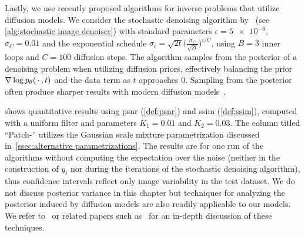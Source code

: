 Lastly, we use recently proposed algorithms for inverse problems that utilize diffusion models.
We consider the stochastic denoising algorithm by~\cite{kawar_stochastic_2021} (see \cref{alg:stochastic image denoiser}) with standard parameters \( \epsilon = \num{5e-6} \), \( \sigma_{C} = \num{0.01} \) and the exponential schedule \( \sigma_i = \sqrt{\num{2}t} \bigl(\frac{\sigma_{C}}{\sqrt{\num{2}t}}\bigr)^{i/C} \), using \( B = \num{3} \) inner loops and \( C = \num{100} \) diffusion steps.
The algorithm samples from the posterior of a denoising problem when utilizing diffusion priors, effectively balancing the prior \( \nabla \log p_\theta(\,\cdot\,, t) \) and the data term as \( t \) approaches \( \num{0} \).
Sampling from the posterior often produce sharper results with modern diffusion models~\cite{Karras2022edm,kawar_stochastic_2021}.
\begin{algorithm}[t]
	\DontPrintSemicolon%
	\caption{%
		Stochastic image denoising algorithm from~\cite{kawar_stochastic_2021}.
	}%
	\label{alg:stochastic image denoiser}
\end{algorithm}

 shows quantitative results using \gls{psnr} (\cref{def:psnr}) and \gls{ssim} (\cref{def:ssim}), computed with a uniform  filter and parameters \( K_{\num{1}} = \num{0.01} \) and \( K_{\num{2}} = \num{0.03} \).
The column titled \enquote{Patch-} utilizes the Gaussian scale mixture parametrization discussed in~\cref{ssec:alternative parametrizations}.
The results are for one run of the algorithms without computing the expectation over the noise (neither in the construction of \( y_t \) nor during the iterations of the stochastic denoising algorithm), thus confidence intervals reflect only image variability in the test dataset.
We do not discuss posterior variance in this chapter but techniques for analyzing the posterior induced by diffusion models are also readily applicable to our models.
We refer to~\cite{kawar_stochastic_2021} or related papers such as~\cite{chung2023diffusion} for an in-depth discussion of these techniques.

